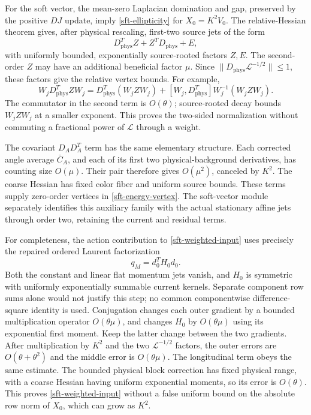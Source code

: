 For the soft vector, the mean-zero Laplacian domination and gap,
preserved by the positive \(DJ\) update, imply
\eqref{sft-ellipticity} for \(X_0=K^2V_0\).
The relative-Hessian theorem gives, after physical rescaling,
first-two source jets of the form
\begin{equation}
 D_{\mathrm{phys}}^TZ+Z^TD_{\mathrm{phys}}+E,
 \label{sft-energy-vertex}
\end{equation}
with uniformly bounded, exponentially source-rooted factors \(Z,E\).
The second-order \(Z\) may have an additional beneficial factor
\(\mu\). Since
\(\|D_{\mathrm{phys}}\mathcal L^{-1/2}\|\le1\),
these factors give the relative vertex bounds. For example,
\[
 W_jD_{\mathrm{phys}}^TZW_j
 =D_{\mathrm{phys}}^T(W_jZW_j)
   +[W_j,D_{\mathrm{phys}}^T]W_j^{-1}(W_jZW_j).
\]
The commutator in the second term is \(O(\theta)\); source-rooted
decay bounds \(W_jZW_j\) at a smaller exponent. This proves the
two-sided normalization without commuting a fractional power of
\(\mathcal L\) through a weight.

The covariant \(D_AD_A^T\) term has the same elementary structure.
Each corrected angle average \(\bar C_A\), and each of its first
two physical-background derivatives, has counting size \(O(\mu)\).
Their pair therefore gives \(O(\mu^2)\), canceled by \(K^2\).
The coarse Hessian has fixed color fiber and uniform source bounds.
These terms supply zero-order vertices in
\eqref{sft-energy-vertex}. The soft-vector module separately
identifies this auxiliary family with the actual stationary affine
jets through order two, retaining the current and residual terms.

For completeness, the action contribution to
\eqref{sft-weighted-input} uses precisely the repaired ordered
Laurent factorization
\begin{equation}
 q_M=d_0^TH_0d_0.
 \label{sft-ordered-factorization}
\end{equation}
Both the constant and linear flat momentum jets vanish, and \(H_0\)
is symmetric with uniformly exponentially summable current kernels.
Separate component row sums alone would not justify this step;
no common componentwise difference-square identity is used.
Conjugation changes each outer gradient by a bounded multiplication
operator \(O(\theta\mu)\), and changes \(H_0\) by \(O(\theta\mu)\)
using its exponential first moment. Keep the latter change between
the two gradients. After multiplication by \(K^2\) and the two
\(\mathcal L^{-1/2}\) factors, the outer errors are
\(O(\theta+\theta^2)\) and the middle error is \(O(\theta\mu)\).
The longitudinal term obeys the same estimate. The bounded physical
block correction has fixed physical range, with a coarse Hessian
having uniform exponential moments, so its error is \(O(\theta)\).
This proves \eqref{sft-weighted-input} without a false uniform bound
on the absolute row norm of \(X_0\), which can grow as \(K^2\).

